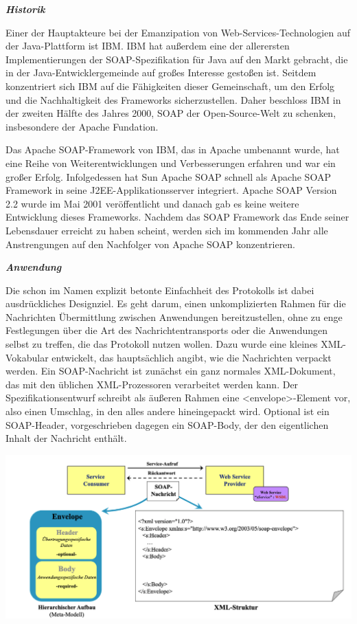 \textit{\textbf{Historik}}

Einer der Hauptakteure bei der Emanzipation von Web-Services-Technologien auf der Java-Plattform ist IBM. IBM hat außerdem eine der allerersten Implementierungen der SOAP-Spezifikation für Java auf den Markt gebracht, die in der Java-Entwicklergemeinde auf großes Interesse gestoßen ist. Seitdem konzentriert sich IBM auf die Fähigkeiten dieser Gemeinschaft, um den Erfolg und die Nachhaltigkeit des Frameworks sicherzustellen. Daher beschloss IBM in der zweiten Hälfte des Jahres 2000, SOAP der Open-Source-Welt zu schenken, insbesondere der Apache Fundation.

Das Apache SOAP-Framework von IBM, das in Apache umbenannt wurde, hat eine Reihe von Weiterentwicklungen und Verbesserungen erfahren und war ein großer Erfolg. Infolgedessen hat Sun Apache SOAP schnell als Apache SOAP Framework in seine J2EE-Applikationsserver integriert. Apache SOAP Version 2.2 wurde im Mai 2001 veröffentlicht und danach gab es keine weitere Entwicklung dieses Frameworks. Nachdem das SOAP Framework das Ende seiner Lebensdauer erreicht zu haben scheint, werden sich im kommenden Jahr alle Anstrengungen auf den Nachfolger von Apache SOAP konzentrieren.

\textit{\textbf{Anwendung}}

Die schon im Namen explizit betonte Einfachheit des Protokolls ist dabei ausdrückliches Designziel. Es geht darum, einen unkomplizierten Rahmen für die Nachrichten Übermittlung zwischen Anwendungen bereitzustellen, ohne zu enge Festlegungen über die Art des Nachrichtentransports oder die Anwendungen selbst zu treffen, die das Protokoll nutzen wollen. Dazu wurde eine kleines XML-Vokabular entwickelt, das hauptsächlich angibt, wie die Nachrichten verpackt werden. Ein SOAP-Nachricht ist zunächst ein ganz normales XML-Dokument, das mit den üblichen XML-Prozessoren verarbeitet werden kann. Der Spezifikationsentwurf schreibt als äußeren Rahmen eine <envelope>-Element vor, also einen Umschlag, in den alles andere hineingepackt wird. Optional ist ein SOAP-Header, vorgeschrieben dagegen ein SOAP-Body, der den eigentlichen Inhalt der Nachricht enthält.\cite{helmut529_30}

\begin{center}
\includegraphics[scale=.4]{images/Struktur_ein_SOAP}
\end{center}

